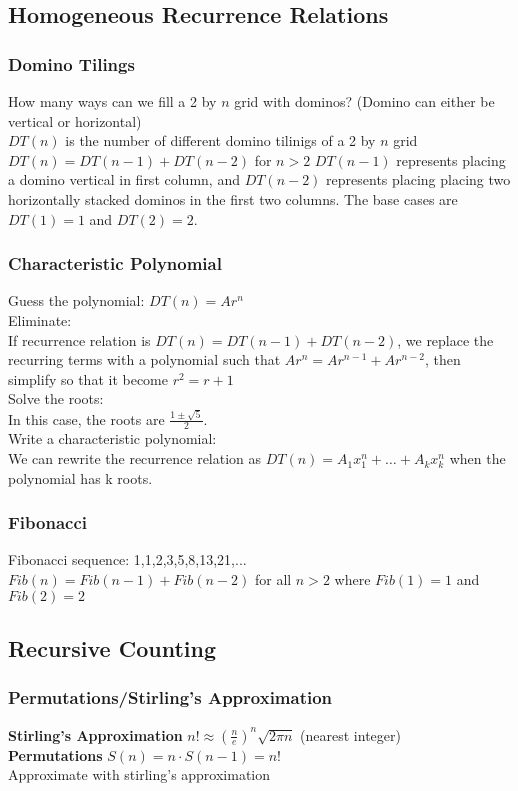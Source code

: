 \documentclass{article}
\begin{document}
\begin{spacing}{1.5}
\subsection{Homogeneous Recurrence Relations}
\label{sec:homogenous}
\subsubsection{Domino Tilings}
\label{sec:domino}
How many ways can we fill a 2 by $n$ grid with dominos? (Domino can either be vertical or horizontal)\\
$DT(n)$ is the number of different domino tilinigs of a 2 by $n$ grid\\
$DT(n) = DT(n-1) + DT(n-2)$ for $n > 2$ $DT(n-1)$ represents placing a domino vertical in first column, and $DT(n-2)$ represents placing placing two horizontally stacked dominos in the first two columns. The base cases are $DT(1)=1$ and $DT(2)=2$.
\subsubsection{Characteristic Polynomial}
\label{sec:characteristic}
Guess the polynomial: $DT(n)=Ar^n$\\
Eliminate:\\
If recurrence relation is $DT(n) = DT(n-1)+DT(n-2)$, we replace the recurring terms with a polynomial such that $Ar^n=Ar^{n-1}+Ar^{n-2}$, then simplify so that it become $r^2=r+1$\\
Solve the roots:\\
In this case, the roots are $\frac{1 \pm \sqrt{5}}{2}$.\\
Write a characteristic polynomial:\\
We can rewrite the recurrence relation as $DT(n)=A_1x_1^{n}+\dots+A_kx_k^{n}$ when the polynomial has k roots.
\subsubsection{Fibonacci}
\label{sec:fibonacci}
Fibonacci sequence: 1,1,2,3,5,8,13,21,...\\
$Fib(n) = Fib(n-1) + Fib(n-2)$ for all $n>2$ where $Fib(1)=1$ and $Fib(2)=2$
\subsection{Recursive Counting}
\label{sec:rcounting}
\subsubsection{Permutations/Stirling's Approximation}
\label{sec:stirling}
\textbf{Stirling's Approximation}
$n! \approx (\frac{n}{e})^n\sqrt{2 \pi n}$ (nearest integer)\\
\textbf{Permutations}
$S(n)=n \cdot S(n-1) = n!$\\
Approximate with stirling's approximation


\end{spacing}
\end{document}
